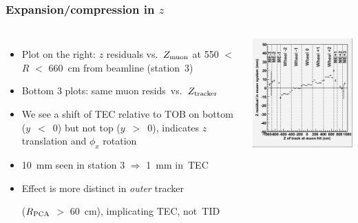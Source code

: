 \documentclass[compress]{beamer}
\begin{document}
\begin{frame}
\frametitle{Expansion/compression in $z$}

\begin{columns}
\begin{itemize}\setlength{\itemsep}{-0.1 cm}
\item Plot on the right: $z$ residuals vs.\ $Z_{\mbox{\scriptsize muon}}$ at 550 $<$ $R$ $<$ 660~cm from beamline \mbox{(station 3)\hspace{-1 cm}}
\item Bottom 3 plots: same muon \mbox{resids vs.\ $Z_{\mbox{\scriptsize tracker}}$\hspace{-1 cm}}

\item We see a shift of TEC relative to TOB on bottom
  \mbox{\scriptsize ($y$ $<$ 0)} but not top \mbox{\scriptsize ($y$ $>$ 0)},
  indicates $z$ translation and $\phi_x$ rotation

\item 10~mm seen in station 3 $\Longrightarrow$ 1~mm \mbox{in TEC\hspace{-1 cm}}

\item Effect is more distinct in {\it outer} tracker

\vspace{-0.1 cm}
($R_{\mbox{\scriptsize PCA}}$ $>$ 60~cm), implicating TEC, \mbox{not TID\hspace{-1 cm}}
\end{itemize}

\includegraphics[width=\linewidth]{zresid_from_muon.png}
\end{columns}


\end{frame}
\end{document}
